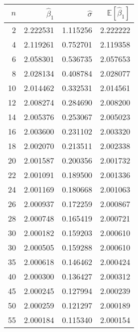 \begin{tabular}{rrrr}
\toprule
 $n$ &  $\hat{\beta}_1$ &  $\hat{\sigma}$ &  $\mathbb{E}[\hat{\beta}_1]$ \\
\midrule
   2 &         2.222531 &        1.115256 &                     2.222222 \\
   4 &         2.119261 &        0.752701 &                     2.119358 \\
   6 &         2.058301 &        0.536735 &                     2.057653 \\
   8 &         2.028134 &        0.408784 &                     2.028077 \\
  10 &         2.014462 &        0.332531 &                     2.014561 \\
  12 &         2.008274 &        0.284690 &                     2.008200 \\
  14 &         2.005376 &        0.253067 &                     2.005023 \\
  16 &         2.003600 &        0.231102 &                     2.003320 \\
  18 &         2.002070 &        0.213511 &                     2.002338 \\
  20 &         2.001587 &        0.200356 &                     2.001732 \\
  22 &         2.001091 &        0.189500 &                     2.001336 \\
  24 &         2.001169 &        0.180668 &                     2.001063 \\
  26 &         2.000937 &        0.172259 &                     2.000867 \\
  28 &         2.000748 &        0.165419 &                     2.000721 \\
  30 &         2.000182 &        0.159203 &                     2.000610 \\
  30 &         2.000505 &        0.159288 &                     2.000610 \\
  35 &         2.000618 &        0.146462 &                     2.000424 \\
  40 &         2.000300 &        0.136427 &                     2.000312 \\
  45 &         2.000245 &        0.127994 &                     2.000239 \\
  50 &         2.000259 &        0.121297 &                     2.000189 \\
  55 &         2.000184 &        0.115340 &                     2.000154 \\

\end{tabular}
